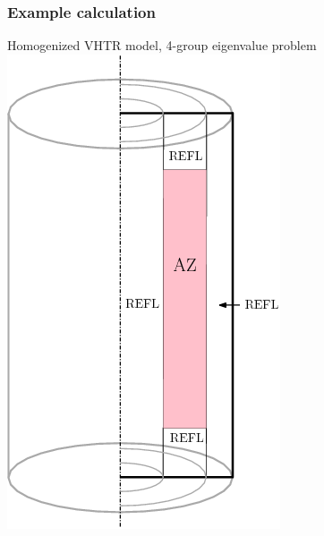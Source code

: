 \begin{frame}[t]
  \frametitle{Example calculation}
  \vspace*{-.3cm}
  \centering\textcolor{structure.bg!95!blue}{ Homogenized VHTR model, 4-group eigenvalue problem }\\
  \hspace*{3.25cm}\includegraphics[scale=.4]{images/Hermes/VHTR.png}
\end{frame}

